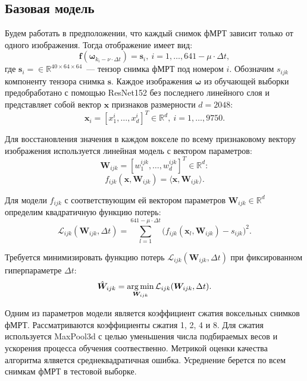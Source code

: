 \documentclass[12pt,twoside]{article}
\begin{document}
\subsection{Базовая модель}
Будем работать в предположении, что каждый снимок фМРТ зависит только от одного изображения.
Тогда отображение имеет вид:
\begin{equation}
	\label{basic_model}
	\bm{f}(\bm{\omega}_{k_i - \nu \cdot \Delta t}) = \bm{s}_i, \ i = 1, \ldots, 641-\mu \cdot \Delta t,
\end{equation}
где $\bm{s}_i = \in \mathbb{R}^{40 \times 64 \times 64}$~--- тензор снимка фМРТ под номером $i$.
Обозначим $s_{ijk}$ компоненту тензора снимка $\bm{s}$.
Каждое изображения $\bm{\omega}$ из обучающей выборки предобработано с помощью ResNet152 без последнего линейного слоя и представляет собой вектор $\bm{x}$ признаков размерности $d=2048$:
\[ \bm{x}_i = [x^i_1, \ldots, x^i_{d}]^{T} \in \mathbb{R}^{d}, \ i = 1, \ldots, 9750. \]
	
Для восстановления значения в каждом вокселе по всему признаковому вектору изображения используется линейная модель с вектором параметров:
\[ \bm{W}_{ijk} = [w^{ijk}_1, \ldots, w^{ijk}_{d}]^{T} \in \mathbb{R}^{d}: \]
\begin{equation}
	\label{f_ijk}
	f_{ijk}(\bm{x}, \bm{W}_{ijk}) = \langle \bm{x}, \bm{W}_{ijk} \rangle.
\end{equation}

Для модели $f_{ijk}$ с соответствующим ей вектором параметров $\bm{W}_{ijk} \in \mathbb{R}^{d}$
определим квадратичную функцию потерь:
\begin{equation}
	\label{Loss}
	\mathcal{L}_{ijk}(\bm{W}_{ijk}, \Delta t) = \sum\limits_{l = 1}^{641 - \mu \cdot \Delta t} \big(f_{ijk}(\bm{x}_l, \bm{W}_{ijk}) - s_{ijk}\big)^2.
\end{equation}

Требуется минимизировать функцию потерь $\mathcal{L}_{ijk}(\bm{W}_{ijk}, \Delta t)$ при фиксированном гиперпараметре $\Delta t$:
\begin{equation}
	\label{basic_Problem}
	\hat{\bm{W}}_{ijk} = \argmin_{\bm{W}_{ijk}} \mathcal{L}_{ijk}(\bm{W}_{ijk}, \Delta t).
\end{equation} 

Одним из параметров модели является коэффициент сжатия воксельных снимков фМРТ. 
Рассматриваются коэффициенты сжатия 1, 2, 4 и 8.
Для сжатия используется MaxPool3d с целью уменьшения числа подбираемых весов и ускорения процесса обучения соотвественно.
Метрикой оценки качества алгоритма ялвяется среднеквадратичная ошибка.
Усреднение берется по всем снимкам фМРТ в тестовой выборке.
\end{document}
